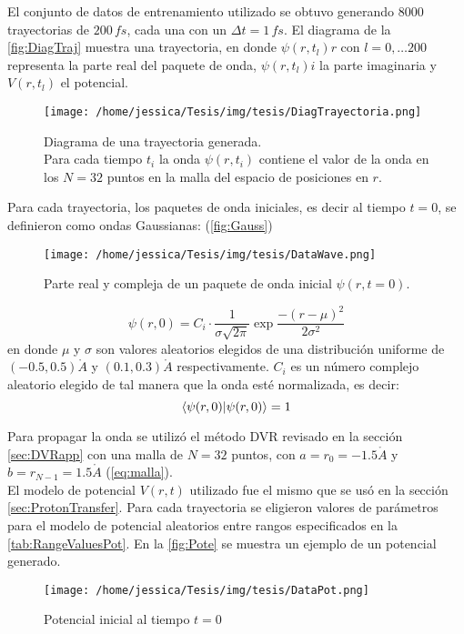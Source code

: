El conjunto de datos de entrenamiento utilizado se obtuvo generando 8000 trayectorias de $200\,fs$, cada una con un $\Delta t = 1\,fs$. El diagrama de la \autoref{fig:DiagTraj} muestra una trayectoria, en donde $\psi(r,t_l)r$ con $l=0,\dots 200$ representa la parte real del paquete de onda, $\psi(r,t_l)i$ la parte imaginaria y $V(r,t_l)$ el potencial.

\begin{figure}[H]
  \centering
  \texttt{[image: /home/jessica/Tesis/img/tesis/DiagTrayectoria.png]}
  \caption{Diagrama de una trayectoria generada.\\Para cada tiempo $t_i$ la onda $\psi(r,t_i)$ contiene el valor de la onda en los $N=32$ puntos en la malla del espacio de posiciones en $r$.}
  \label{fig:DiagTraj}
\end{figure}

Para cada trayectoria, los paquetes de onda iniciales, es decir al tiempo $t=0$, se definieron como ondas Gaussianas: (\autoref{fig:Gauss})
\begin{figure}[H]
  \centering
  \texttt{[image: /home/jessica/Tesis/img/tesis/DataWave.png]}
  \caption{Parte real y compleja de un paquete de onda inicial $\psi(r,t=0)$.}
  \label{fig:Gauss}
\end{figure}

\begin{equation}
  \label{eq:gaussian}
  \psi(r,0) = C_i\cdot \frac{1}{\sigma\sqrt{2\pi}}\exp{\frac{-(r-\mu)^2}{2\sigma^2}}
\end{equation}
en donde $\mu$ y $\sigma$ son valores aleatorios elegidos de una distribución uniforme de $(-0.5,0.5)\mathring{A}$ y $(0.1,0.3)\mathring{A}$ respectivamente. $C_i$ es un número complejo aleatorio elegido de tal manera que la onda esté normalizada, es decir:
$$\bra{\psi(r,0)}\ket{\psi(r,0)} = 1$$

Para propagar la onda se utilizó el método \acs{DVR} revisado en la sección \autoref{sec:DVRapp} con una malla de $N=32$ puntos, con $a=r_0=-1.5\mathring{A}$ y $b=r_{N-1}=1.5\mathring{A}$ (\autoref{eq:malla}).
\\
El modelo de potencial $V(r,t)$ utilizado fue el mismo que se usó en la sección \autoref{sec:ProtonTransfer}. Para cada trayectoria se eligieron valores de parámetros para el modelo de potencial aleatorios entre rangos especificados en la \autoref{tab:RangeValuesPot}. En la \autoref{fig:Pote} se muestra un ejemplo de un potencial generado.
\begin{figure}[H]
  \centering
  \texttt{[image: /home/jessica/Tesis/img/tesis/DataPot.png]}
  \caption{Potencial inicial al tiempo $t=0$}
  \label{fig:Pote}
\end{figure}


